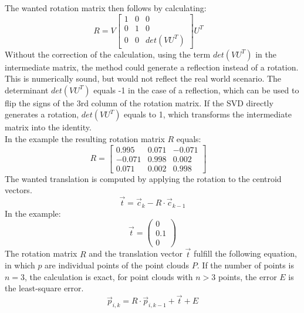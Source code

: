 The wanted rotation matrix then follows by calculating:
\begin{equation*}
    R=V
    \begin{bmatrix}
        1 & 0 & 0 \\
        0 & 1 & 0 \\
        0 & 0 & det(VU^{T})
    \end{bmatrix}U^{T} \quad
\end{equation*}
Without the correction of the calculation, using the term $det(VU^{T})$ in the intermediate matrix, the method could generate a reflection instead of a rotation. This is numerically sound, but would not reflect the real world scenario. The determinant $det(VU^{T})$ equals -1 in the case of a reflection, which can be used to flip the signs of the 3rd column of the rotation matrix. If the SVD directly generates a rotation, $det(VU^{T})$ equals to 1, which transforms the intermediate matrix into the identity.\\
In the example the resulting rotation matrix $R$ equals:
\begin{equation*}
    R=
    \begin{bmatrix}
        0.995 & 0.071  & -0.071 \\
        -0.071 & 0.998  & 0.002 \\
        0.071& 0.002 & 0.998
    \end{bmatrix} \quad
\end{equation*}
The wanted translation is computed by applying the rotation to the centroid vectors. 
\begin{equation*}
    \vec{t} = \vec{c}_{k}-R\cdot\vec{c}_{k-1}
\end{equation*}
In the example:
\begin{equation*}
    \vec{t} = 
    \begin{pmatrix}
        0 \\
        0.1 \\
        0
    \end{pmatrix}
\end{equation*}
The rotation matrix $R$ and the translation vector $\vec{t}$ fulfill the following equation, in which $p$ are individual points of the point clouds $P$. If the number of points is $n=3$, the calculation is exact, for point clouds with $n>3$ points, the error $E$ is the least-square error\cite{SVD_ETH}.
\begin{equation*}
    \vec{p}_{i,k} = R\cdot\vec{p}_{i,k-1}+\vec{t}+E
\end{equation*}

